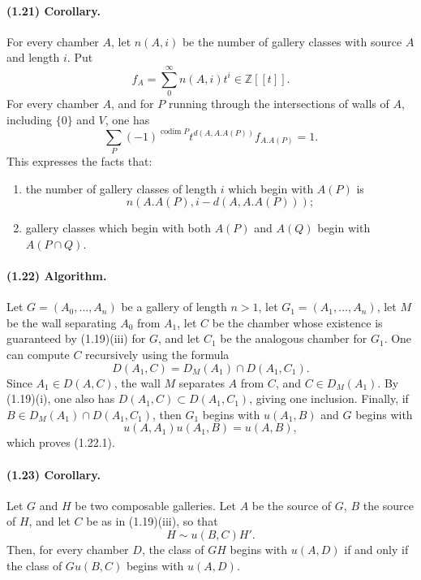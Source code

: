 \documentclass[10pt]{article}
\newcommand{\Z}{\mathbb Z}
\newcommand{\codim}{\operatorname{codim}}
\begin{document}
\paragraph{(1.21) Corollary.} For every chamber $A$, let $n(A,i)$ be the number of gallery classes with source $A$ and length $i$. Put
\[
f_A=\sum_{0}^{\infty}n(A,i)t^i\in\Z[[t]].
\]
For every chamber $A$, and for $P$ running through the intersections of walls of $A$, including $\{0\}$ and $V$, one has
\[
\sum_P (-1)^{\codim P}t^{d(A,A.A(P))}f_{A.A(P)}=1.
\]
This expresses the facts that:
\begin{enumerate}[label=\alph*)]
\item the number of gallery classes of length $i$ which begin with $A(P)$ is
\[
n(A.A(P),i-d(A,A.A(P)));
\]
\item gallery classes which begin with both $A(P)$ and $A(Q)$ begin with $A(P\cap Q)$.
\end{enumerate}

\paragraph{(1.22) Algorithm.} Let $G=(A_0,\ldots,A_n)$ be a gallery of length $n>1$, let $G_1=(A_1,\ldots,A_n)$, let $M$ be the wall separating $A_0$ from $A_1$, let $C$ be the chamber whose existence is guaranteed by (1.19)(iii) for $G$, and let $C_1$ be the analogous chamber for $G_1$. One can compute $C$ recursively using the formula
\[
\tag{1.22.1}
D(A_1,C)=D_M(A_1)\cap D(A_1,C_1).
\]
Since $A_1\in D(A,C)$, the wall $M$ separates $A$ from $C$, and $C\in D_M(A_1)$. By (1.19)(i), one also has $D(A_1,C)\subset D(A_1,C_1)$, giving one inclusion. Finally, if $B\in D_M(A_1)\cap D(A_1,C_1)$, then $G_1$ begins with $u(A_1,B)$ and $G$ begins with
\[
u(A,A_1)u(A_1,B)=u(A,B),
\]
which proves (1.22.1).

\paragraph{(1.23) Corollary.} Let $G$ and $H$ be two composable galleries. Let $A$ be the source of $G$, $B$ the source of $H$, and let $C$ be as in (1.19)(iii), so that
\[
H\sim u(B,C)H'.
\]
Then, for every chamber $D$, the class of $GH$ begins with $u(A,D)$ if and only if the class of $Gu(B,C)$ begins with $u(A,D)$.
\end{document}
